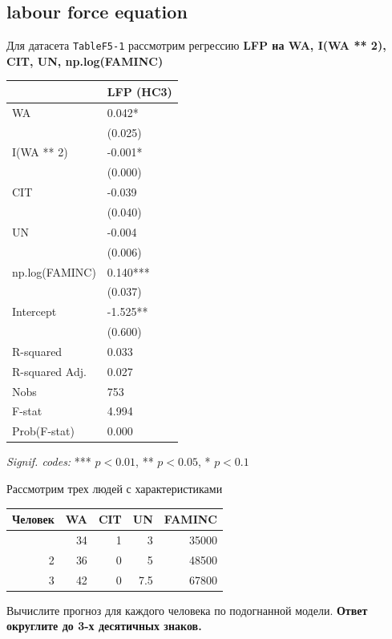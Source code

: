 \documentclass[
  russian,
]{article}
\newcounter{none} %
\begin{document}
\subsection{labour force equation}\label{labour-force-equation}

Для датасета \texttt{TableF5-1} рассмотрим регрессию \textbf{LFP на WA,
I(WA ** 2), CIT, UN, np.log(FAMINC)}

{\def\LTcaptype{none} %
\begin{longtable}[]{@{}ll@{}}
\toprule\noalign{}
& LFP (HC3) \\
\midrule\noalign{}
\endhead
\bottomrule\noalign{}
\endlastfoot
WA & 0.042* \\
& (0.025) \\
I(WA ** 2) & -0.001* \\
& (0.000) \\
CIT & -0.039 \\
& (0.040) \\
UN & -0.004 \\
& (0.006) \\
np.log(FAMINC) & 0.140*** \\
& (0.037) \\
Intercept & -1.525** \\
& (0.600) \\
R-squared & 0.033 \\
R-squared Adj. & 0.027 \\
Nobs & 753 \\
F-stat & 4.994 \\
Prob(F-stat) & 0.000 \\
\end{longtable}
}

\emph{Signif. codes:} *** \(p<0.01\), ** \(p<0.05\), * \(p<0.1\)

Рассмотрим трех людей с характеристиками

{\def\LTcaptype{none} %
\begin{longtable}[]{@{}rrrrr@{}}
\toprule\noalign{}
Человек & WA & CIT & UN & FAMINC \\
\midrule\noalign{}
\endhead
\bottomrule\noalign{}
\endlastfoot
1 & 34 & 1 & 3 & 35000 \\
2 & 36 & 0 & 5 & 48500 \\
3 & 42 & 0 & 7.5 & 67800 \\
\end{longtable}
}

Вычислите прогноз для каждого человека по подогнанной модели.
\textbf{Ответ округлите до 3-х десятичных знаков.}
\end{document}
